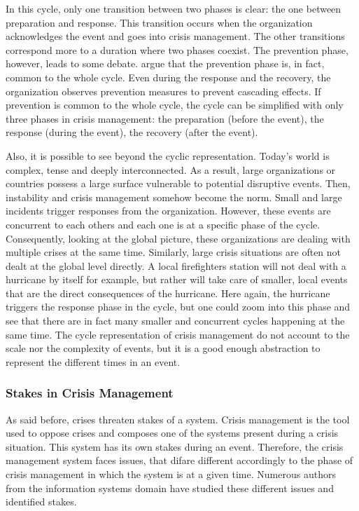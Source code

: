 In this cycle, only one transition between two phases is clear: the one between preparation and response.
This transition occurs when the organization acknowledges the event and goes into crisis management.
The other transitions correspond more to a duration where two phases coexist.
The prevention phase, however, leads to some debate.
\cite{benabenCollaborative2014} argue that the prevention phase is, in fact, common to the whole cycle.
Even during the response and the recovery, the organization observes prevention measures to prevent cascading effects.
If prevention is common to the whole cycle, the cycle can be simplified with only three phases in crisis management: the preparation (before the event), the response (during the event), the recovery (after the event).

Also, it is possible to see beyond the cyclic representation.
Today's world is complex, tense and deeply interconnected. %
As a result, large organizations or countries possess a large surface vulnerable to potential disruptive events.
Then, instability and crisis management somehow become the norm.
Small and large incidents trigger responses from the organization.
However, these events are concurrent to each others and each one is at a specific phase of the cycle.
Consequently, looking at the global picture, these organizations are dealing with multiple crises at the same time.
Similarly, large crisis situations are often not dealt at the global level directly.
A local firefighters station will not deal with a hurricane by itself for example, but rather will take care of smaller, local events that are the direct consequences of the hurricane.
Here again, the hurricane triggers the response phase in the cycle, but one could zoom into this phase and see that there are in fact many smaller and concurrent cycles happening at the same time.
The cycle representation of crisis management do not account to the scale nor the complexity of events, but it is a good enough abstraction to represent the different times in an event.

\subsubsection{Stakes in Crisis Management}
As said before, crises threaten stakes of a system.
Crisis management is the tool used to oppose crises and composes one of the systems present during a crisis situation.
This system has its own stakes during an event.
Therefore, the crisis management system faces issues, that difare different accordingly to the phase of crisis management in which the system is at a given time.
Numerous authors from the information systems domain have studied these different issues and identified stakes.

